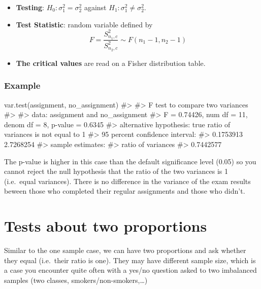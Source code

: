 \documentclass[
  letterpaper,
  DIV=11,
  numbers=noendperiod]{scrreprt}
\newenvironment{Shaded}{\begin{snugshade}}{\end{snugshade}}
\newcommand{\CommentTok}[1]{\textcolor[rgb]{0.37,0.37,0.37}{#1}}
\newcommand{\FunctionTok}[1]{\textcolor[rgb]{0.28,0.35,0.67}{#1}}
\newcommand{\NormalTok}[1]{\textcolor[rgb]{0.00,0.23,0.31}{#1}}
\providecommand{\tightlist}{%
  \setlength{\itemsep}{0pt}\setlength{\parskip}{0pt}}\usepackage{longtable,booktabs,array}
\begin{document}
\begin{itemize}
\tightlist
\item
  \textbf{Testing}: \(H_0: \sigma^2_1 = \sigma^2_2\) against
  \(H_1: \sigma^2_1 \neq  \sigma^2_2\).
\item
  \textbf{Test Statistic}: random variable defined by
  \[F = \dfrac{S^2_{n_1,c}}{S^2_{n_2,c}} \sim F(n_1 - 1, n_2 - 1)\]
\item
  \textbf{The critical values} are read on a Fisher distribution table.
\end{itemize}

\subsubsection{Example}\label{example-11}

\begin{Shaded}
\begin{Highlighting}[]
\FunctionTok{var.test}\NormalTok{(assignment, no\_assignment)}
\CommentTok{\#\textgreater{} }
\CommentTok{\#\textgreater{}  F test to compare two variances}
\CommentTok{\#\textgreater{} }
\CommentTok{\#\textgreater{} data:  assignment and no\_assignment}
\CommentTok{\#\textgreater{} F = 0.74426, num df = 11, denom df = 8, p{-}value = 0.6345}
\CommentTok{\#\textgreater{} alternative hypothesis: true ratio of variances is not equal to 1}
\CommentTok{\#\textgreater{} 95 percent confidence interval:}
\CommentTok{\#\textgreater{}  0.1753913 2.7268254}
\CommentTok{\#\textgreater{} sample estimates:}
\CommentTok{\#\textgreater{} ratio of variances }
\CommentTok{\#\textgreater{}          0.7442577}
\end{Highlighting}
\end{Shaded}

The p-value is higher in this case than the default significance level
(0.05) so you cannot reject the null hypothesis that the ratio of the
two variances is 1 (i.e.~equal variances). There is no difference in the
variance of the exam results beween those who completed their regular
assignments and those who didn't.

\section{Tests about two proportions}\label{tests-about-two-proportions}

Similar to the one sample case, we can have two proportions and ask
whether they equal (i.e.~their ratio is one). They may have different
sample size, which is a case you encounter quite often with a yes/no
question asked to two imbalanced samples (two classes,
smokers/non-smokers,\ldots)
\end{document}
